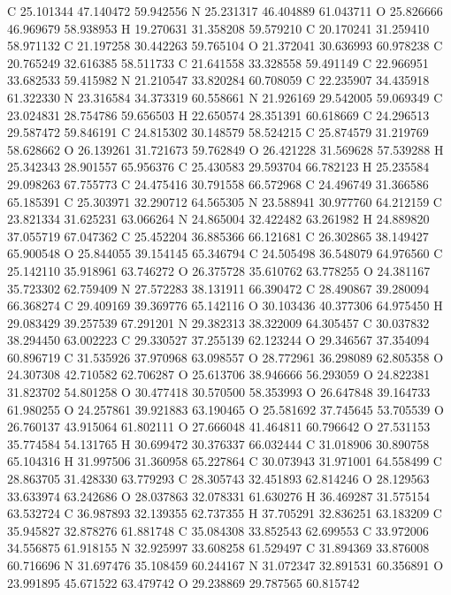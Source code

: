 \documentclass{article}
\begin{document}
C 25.101344 47.140472 59.942556 
N 25.231317 46.404889 61.043711 
O 25.826666 46.969679 58.938953 
H 19.270631 31.358208 59.579210 
C 20.170241 31.259410 58.971132 
C 21.197258 30.442263 59.765104 
O 21.372041 30.636993 60.978238 
C 20.765249 32.616385 58.511733 
C 21.641558 33.328558 59.491149 
C 22.966951 33.682533 59.415982 
N 21.210547 33.820284 60.708059 
C 22.235907 34.435918 61.322330 
N 23.316584 34.373319 60.558661 
N 21.926169 29.542005 59.069349 
C 23.024831 28.754786 59.656503 
H 22.650574 28.351391 60.618669 
C 24.296513 29.587472 59.846191 
C 24.815302 30.148579 58.524215 
C 25.874579 31.219769 58.628662 
O 26.139261 31.721673 59.762849 
O 26.421228 31.569628 57.539288 
H 25.342343 28.901557 65.956376 
C 25.430583 29.593704 66.782123 
H 25.235584 29.098263 67.755773 
C 24.475416 30.791558 66.572968 
C 24.496749 31.366586 65.185391 
C 25.303971 32.290712 64.565305 
N 23.588941 30.977760 64.212159 
C 23.821334 31.625231 63.066264 
N 24.865004 32.422482 63.261982 
H 24.889820 37.055719 67.047362 
C 25.452204 36.885366 66.121681 
C 26.302865 38.149427 65.900548 
O 25.844055 39.154145 65.346794 
C 24.505498 36.548079 64.976560 
C 25.142110 35.918961 63.746272 
O 26.375728 35.610762 63.778255 
O 24.381167 35.723302 62.759409 
N 27.572283 38.131911 66.390472 
C 28.490867 39.280094 66.368274 
C 29.409169 39.369776 65.142116 
O 30.103436 40.377306 64.975450 
H 29.083429 39.257539 67.291201 
N 29.382313 38.322009 64.305457 
C 30.037832 38.294450 63.002223 
C 29.330527 37.255139 62.123244 
O 29.346567 37.354094 60.896719 
C 31.535926 37.970968 63.098557 
O 28.772961 36.298089 62.805358 
O 24.307308 42.710582 62.706287 
O 25.613706 38.946666 56.293059 
O 24.822381 31.823702 54.801258 
O 30.477418 30.570500 58.353993 
O 26.647848 39.164733 61.980255 
O 24.257861 39.921883 63.190465 
O 25.581692 37.745645 53.705539 
O 26.760137 43.915064 61.802111 
O 27.666048 41.464811 60.796642 
O 27.531153 35.774584 54.131765 
H 30.699472 30.376337 66.032444 
C 31.018906 30.890758 65.104316 
H 31.997506 31.360958 65.227864 
C 30.073943 31.971001 64.558499 
C 28.863705 31.428330 63.779293 
C 28.305743 32.451893 62.814246 
O 28.129563 33.633974 63.242686 
O 28.037863 32.078331 61.630276 
H 36.469287 31.575154 63.532724 
C 36.987893 32.139355 62.737355 
H 37.705291 32.836251 63.183209 
C 35.945827 32.878276 61.881748 
C 35.084308 33.852543 62.699553 
C 33.972006 34.556875 61.918155 
N 32.925997 33.608258 61.529497 
C 31.894369 33.876008 60.716696 
N 31.697476 35.108459 60.244167 
N 31.072347 32.891531 60.356891 
O 23.991895 45.671522 63.479742 
O 29.238869 29.787565 60.815742 
\end{document}
